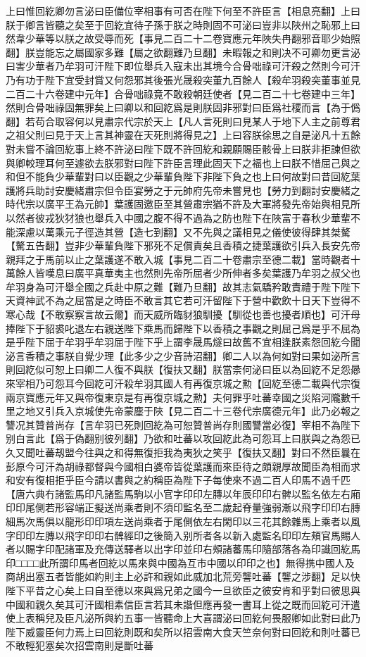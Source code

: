 上曰惟回紇卿勿言泌曰臣備位宰相事有可否在陛下何至不許臣言【相息亮翻】上曰朕于卿言皆聽之矣至于回紇宜待子孫于朕之時則固不可泌曰豈非以陜州之恥邪上曰然韋少華等以朕之故受辱而死【事見二百二十二卷寶應元年陜失冉翻邪音耶少始照翻】朕豈能忘之屬國家多難【屬之欲翻難乃旦翻】未暇報之和則决不可卿勿更言泌曰害少華者乃牟羽可汗陛下即位舉兵入寇未出其境今合骨咄祿可汗殺之然則今可汗乃有功于陛下宜受封賞又何怨邪其後張光晟殺突董九百餘人【殺牟羽殺突董事並見二百二十六卷建中元年】合骨咄祿竟不敢殺朝廷使者【見二百二十七卷建中三年】然則合骨咄祿固無罪矣上曰卿以和回紇爲是則朕固非邪對曰臣爲社稷而言【為于僞翻】若苟合取容何以見肅宗代宗於天上【凡人言死則曰見某人于地下人主之前尊君之祖父則曰見于天上言其神靈在天死則將得見之】上曰容朕徐思之自是泌凡十五餘對未嘗不論回紇事上終不許泌曰陛下既不許回紇和親願賜臣骸骨上曰朕非拒諫但欲與卿較理耳何至遽欲去朕邪對曰陛下許臣言理此固天下之福也上曰朕不惜屈己與之和但不能負少華輩對曰以臣觀之少華輩負陛下非陛下負之也上曰何故對曰昔回紇葉護將兵助討安慶緒肅宗但令臣宴勞之于元帥府先帝未嘗見也【勞力到翻討安慶緒之時代宗以廣平王為元帥】葉護固邀臣至其營肅宗猶不許及大軍將發先帝始與相見所以然者彼戎狄犲狼也舉兵入中國之腹不得不過為之防也陛下在陜富于春秋少華輩不能深慮以萬乘元子徑造其營【造七到翻】又不先與之議相見之儀使彼得肆其桀驁【驁五告翻】豈非少華輩負陛下邪死不足償責矣且香積之捷葉護欲引兵入長安先帝親拜之于馬前以止之葉護遂不敢入城【事見二百二十卷肅宗至德二載】當時觀者十萬餘人皆嘆息曰廣平真華夷主也然則先帝所屈者少所伸者多矣葉護乃牟羽之叔父也牟羽身為可汗舉全國之兵赴中原之難【難乃旦翻】故其志氣驕矜敢責禮于陛下陛下天資神武不為之屈當是之時臣不敢言其它若可汗留陛下于營中歡飲十日天下豈得不寒心哉【不敢察察言故云爾】而天威所臨豺狼馴擾【馴從也善也擾者順也】可汗母捧陛下于貂裘叱退左右親送陛下乘馬而歸陛下以香積之事觀之則屈己爲是乎不屈為是乎陛下屈于牟羽乎牟羽屈于陛下乎上謂李晟馬燧曰故舊不宜相逢朕素怨回紇今聞泌言香積之事朕自覺少理【此多少之少音詩沼翻】卿二人以為何如對曰果如泌所言則回紇似可恕上曰卿二人復不與朕【復扶又翻】朕當柰何泌曰臣以為回紇不足怨曏來宰相乃可怨耳今回紇可汗殺牟羽其國人有再復京城之勲【回紇至德二載與代宗復兩京寶應元年又與帝復東京是有再復京城之勲】夫何罪乎吐蕃幸國之災陷河隴數千里之地又引兵入京城使先帝蒙塵于陜【見二百二十三卷代宗廣德元年】此乃必報之讐况其贊普尚存【言牟羽已死則回紇為可恕贊普尚存則國讐當必復】宰相不為陛下别白言此【爲于偽翻别彼列翻】乃欲和吐蕃以攻回紇此為可怨耳上曰朕與之為怨已久又聞吐蕃刼盟今往與之和得無復拒我為夷狄之笑乎【復扶又翻】對曰不然臣曩在彭原今可汗為胡祿都督與今國相白婆帝皆從葉護而來臣待之頗親厚故聞臣為相而求和安有復相拒乎臣今請以書與之約稱臣為陛下子每使來不過二百人印馬不過千匹【唐六典冇諸監馬印凡諸監馬駒以小官字印印左膞以年辰印印右髀以監名依左右廂印印尾側若形容端正擬送尚乘者則不須印監名至二歲起脊量強弱漸以飛字印印右膞細馬次馬俱以龍形印印項左送尚乘者于尾側依左右閑印以三花其餘雜馬上乘者以風字印印左膞以飛字印印右髀經印之後簡入别所者各以新入處監名印印左頰官馬賜人者以賜字印配諸軍及充傳送驛者以出字印並印右頰諸蕃馬印隨部落各為印識回紇馬印□□□□此所謂印馬者回紇以馬來與中國為互市中國以印印之也】無得携中國人及商胡出塞五者皆能如約則主上必許和親如此威加北荒旁讋吐蕃【讋之涉翻】足以快陛下平昔之心矣上曰自至德以來與爲兄弟之國今一旦欲臣之彼安肯和乎對曰彼思與中國和親久矣其可汗國相素信臣言若其未諧但應再發一書耳上從之既而回紇可汗遣使上表稱兒及臣凡泌所與約五事一皆聽命上大喜謂泌曰回紇何畏服卿如此對曰此乃陛下威靈臣何力焉上曰回紇則既和矣所以招雲南大食天竺奈何對曰回紇和則吐蕃已不敢輕犯塞矣次招雲南則是斷吐蕃
